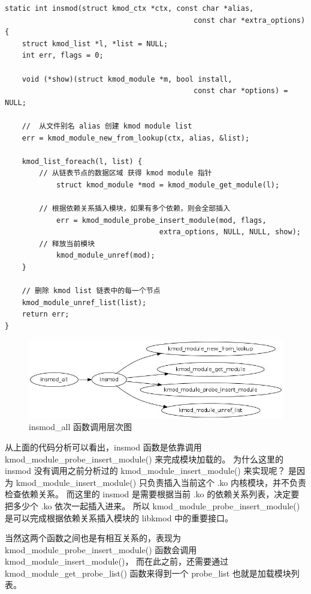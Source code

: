 \documentclass[11pt,a4paper]{article}
\makeatletter
\def\maxwidth{\ifdim\Gin@nat@width>\linewidth\linewidth
\else\Gin@nat@width\fi}
\let\Oldincludegraphics\includegraphics
\renewcommand{\includegraphics}[1]{\Oldincludegraphics[width=\maxwidth]{#1}}
\makeatother
\begin{document}
{\begin{shaded}\begin{verbatim}
static int insmod(struct kmod_ctx *ctx, const char *alias,
                                            const char *extra_options)
{
    struct kmod_list *l, *list = NULL;
    int err, flags = 0;

    void (*show)(struct kmod_module *m, bool install,
                                            const char *options) = NULL;

    //  从文件别名 alias 创建 kmod module list
    err = kmod_module_new_from_lookup(ctx, alias, &list);

    kmod_list_foreach(l, list) {
        // 从链表节点的数据区域 获得 kmod module 指针
            struct kmod_module *mod = kmod_module_get_module(l);

        // 根据依赖关系插入模块，如果有多个依赖，则会全部插入
            err = kmod_module_probe_insert_module(mod, flags,
                                    extra_options, NULL, NULL, show);
        // 释放当前模块
            kmod_module_unref(mod);
    }

    // 删除 kmod list 链表中的每一个节点
    kmod_module_unref_list(list);
    return err;
}
\end{verbatim}\end{shaded}}
\begin{figure}[htbp]
\centering
\includegraphics{./figures/insmod_all.jpg}
\caption{insmod\_all 函数调用层次图}
\end{figure}

从上面的代码分析可以看出，insmod 函数是依靠调用
kmod\_module\_probe\_insert\_module() 来完成模块加载的。 为什么这里的
insmod 没有调用之前分析过的 kmod\_module\_insert\_module() 来实现呢？
是因为 kmod\_module\_insert\_module() 只负责插入当前这个 .ko
内核模块，并不负责检查依赖关系。 而这里的 insmod 是需要根据当前 .ko
的依赖关系列表，决定要把多少个 .ko 依次一起插入进来。 所以
kmod\_module\_probe\_insert\_module() 是可以完成根据依赖关系插入模块的
libkmod 中的重要接口。

当然这两个函数之间也是有相互关系的，表现为
kmod\_module\_probe\_insert\_module() 函数会调用
kmod\_module\_insert\_module()， 而在此之前，还需要通过
kmod\_module\_get\_probe\_list() 函数来得到一个 probe\_list
也就是加载模块列表。
\end{document}
